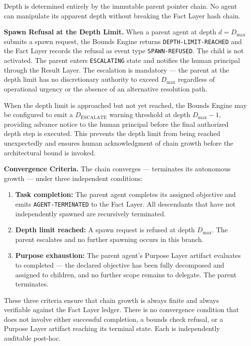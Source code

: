 Depth is determined entirely by the immutable parent pointer chain. No agent can manipulate its apparent depth without breaking the Fact Layer hash chain.

\bigskip
\noindent\textbf{Spawn Refusal at the Depth Limit.} When a parent agent at depth $d = D_{\max}$ submits a spawn request, the Bounds Engine returns \texttt{DEPTH-LIMIT-REACHED} and the Fact Layer records the refusal as event type \texttt{SPAWN-REFUSED}. The child is not activated. The parent enters \texttt{ESCALATING} state and notifies the human principal through the Result Layer. The escalation is mandatory — the parent at the depth limit has no discretionary authority to exceed $D_{\max}$ regardless of operational urgency or the absence of an alternative resolution path.

When the depth limit is approached but not yet reached, the Bounds Engine may be configured to emit a $D_{\text{ESCALATE}}$ warning threshold at depth $D_{\max} - 1$, providing advance notice to the human principal before the final authorized depth step is executed. This prevents the depth limit from being reached unexpectedly and ensures human acknowledgment of chain growth before the architectural bound is invoked.

\bigskip
\noindent\textbf{Convergence Criteria.} The chain converges — terminates its autonomous growth — under three independent conditions:

\begin{enumerate}
  \item[(CC-1)] \textbf{Task completion:} The parent agent completes its assigned objective and emits \texttt{AGENT-TERMINATED} to the Fact Layer. All descendants that have not independently spawned are recursively terminated.

  \item[(CC-2)] \textbf{Depth limit reached:} A spawn request is refused at depth $D_{\max}$. The parent escalates and no further spawning occurs in this branch.

  \item[(CC-3)] \textbf{Purpose exhaustion:} The parent agent's Purpose Layer artifact evaluates to completed — the declared objective has been fully decomposed and assigned to children, and no further scope remains to delegate. The parent terminates.
\end{enumerate}

These three criteria ensure that chain growth is always finite and always verifiable against the Fact Layer ledger. There is no convergence condition that does not involve either successful completion, a bounds check refusal, or a Purpose Layer artifact reaching its terminal state. Each is independently auditable post-hoc.

